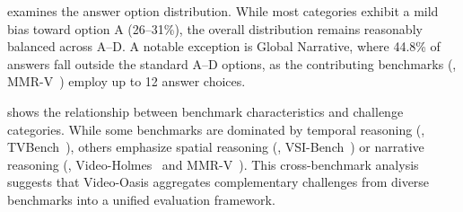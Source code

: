         \clearpage

         examines the answer option distribution. While most categories exhibit a mild bias toward option A (26--31\%), the overall distribution remains reasonably balanced across A--D. A notable exception is Global Narrative, where 44.8\% of answers fall outside the standard A--D options, as the contributing benchmarks (\eg, MMR-V~\cite{mmrv}) employ up to 12 answer choices. 
        
        \begin{table}[h]
        \centering
        \caption{Multiple-choice answer distribution across categories.}
        \label{tab:supp_answer_dist}
        \end{table}

         shows the relationship between benchmark characteristics and challenge categories. 
        While some benchmarks are dominated by temporal reasoning (\eg, TVBench~\cite{tvbench}), others emphasize spatial reasoning (\eg, VSI-Bench~\cite{vsibench}) or narrative reasoning (\eg, Video-Holmes~\cite{videoholmes} and MMR-V~\cite{mmrv}).
        This cross-benchmark analysis suggests that Video-Oasis aggregates complementary challenges from diverse benchmarks into a unified evaluation framework.

